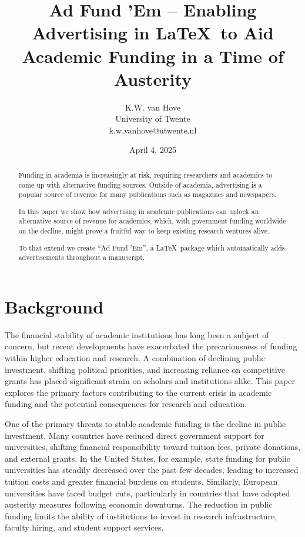 \documentclass[letterpaper, twocolumn]{article}
\title{Ad Fund 'Em -- Enabling Advertising in \LaTeX \ to Aid Academic Funding in a Time of Austerity}
\author{
	K.W. van Hove \\ University of Twente\\
	k.w.vanhove@utwente.nl
}
\date{April 4, 2025}
\begin{document}
	\maketitle
	
	\begin{abstract}
		Funding in academia is increasingly at risk, requiring researchers and academics to come up with alternative funding sources. Outside of academia, advertising is a popular source of revenue for many publications such as magazines and newspapers.
		
		In this paper we show how advertising in academic publications can unlock an alternative source of revenue for academics, which, with government funding worldwide on the decline, might prove a fruitful way to keep existing research ventures alive.
		
		To that extend we create ``Ad Fund 'Em'', a \LaTeX \ package which automatically adds advertisements throughout a manuscript.
	\end{abstract}
	
	
	\section{Background}
	The financial stability of academic institutions has long been a subject of concern, but recent developments have exacerbated the precariousness of funding within higher education and research. A combination of declining public investment, shifting political priorities, and increasing reliance on competitive grants has placed significant strain on scholars and institutions alike. This paper explores the primary factors contributing to the current crisis in academic funding and the potential consequences for research and education.
	
	One of the primary threats to stable academic funding is the decline in public investment. Many countries have reduced direct government support for universities, shifting financial responsibility toward tuition fees, private donations, and external grants. In the United States, for example, state funding for public universities has steadily decreased over the past few decades, leading to increased tuition costs and greater financial burdens on students. Similarly, European universities have faced budget cuts, particularly in countries that have adopted austerity measures following economic downturns. The reduction in public funding limits the ability of institutions to invest in research infrastructure, faculty hiring, and student support services.
	
\end{document}
